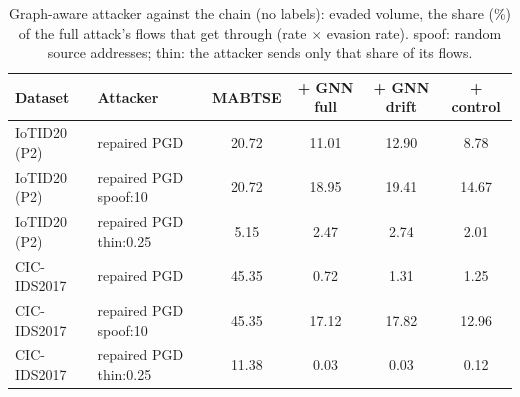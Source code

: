 \begin{table}[t]
\centering
\caption{Graph-aware attacker against the chain (no labels): evaded volume, the share (\%) of the full attack's flows that get through (rate $\times$ evasion rate). spoof: random source addresses; thin: the attacker sends only that share of its flows.}
\label{tab:graph_adaptive}
\footnotesize
\setlength{\tabcolsep}{3pt}
\begin{tabular}{llcccc}
\toprule
Dataset & Attacker & MABTSE & + GNN full & + GNN drift & + control \\
\midrule
IoTID20 (P2) & repaired PGD & 20.72 & 11.01 & 12.90 & 8.78 \\
IoTID20 (P2) & repaired PGD spoof:10 & 20.72 & 18.95 & 19.41 & 14.67 \\
IoTID20 (P2) & repaired PGD thin:0.25 & 5.15 & 2.47 & 2.74 & 2.01 \\
CIC-IDS2017 & repaired PGD & 45.35 & 0.72 & 1.31 & 1.25 \\
CIC-IDS2017 & repaired PGD spoof:10 & 45.35 & 17.12 & 17.82 & 12.96 \\
CIC-IDS2017 & repaired PGD thin:0.25 & 11.38 & 0.03 & 0.03 & 0.12 \\
\bottomrule
\end{tabular}
\end{table}
